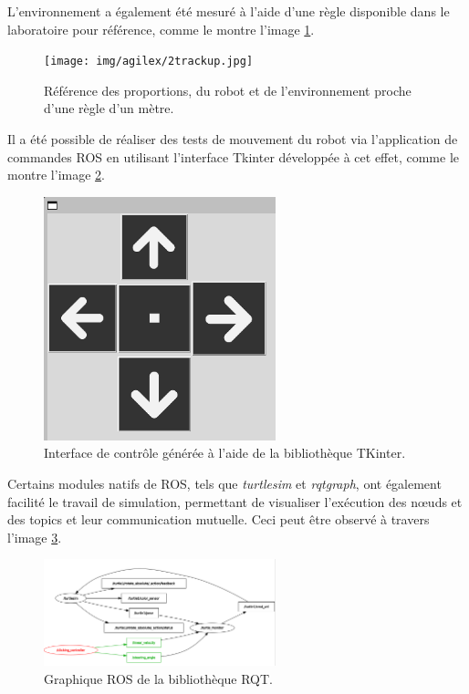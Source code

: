 L'environnement a également été mesuré à l'aide d'une règle disponible dans le laboratoire pour référence, comme le montre l'image \ref{img:track2}.

\begin{figure}[!h]
    \centering
    \texttt{[image: img/agilex/2trackup.jpg]} 
    \caption{Référence des proportions, du robot et de l'environnement proche d'une règle d'un mètre. }
    \label{img:track2}
\end{figure}
\FloatBarrier

Il a été possible de réaliser des tests de mouvement du robot via l'application de commandes ROS en utilisant l'interface Tkinter développée à cet effet, comme le montre l'image \ref{img:click}.

\begin{figure}[!h]
    \centering
    \includegraphics[width=0.6\textwidth]{img/agilex/click.png} 
    \caption{Interface de contrôle générée à l'aide de la bibliothèque TKinter.}
    \label{img:click}
\end{figure}
\FloatBarrier

Certains modules natifs de ROS, tels que \textit{turtlesim} et \textit{rqtgraph}, ont également facilité le travail de simulation, permettant de visualiser l'exécution des nœuds et des topics et leur communication mutuelle. Ceci peut être observé à travers l'image \ref{img:rqt_graph}.

\begin{figure}[!h]
    \centering
    \includegraphics[width=0.6\textwidth]{img/agilex/rqt_graph.png} 
    \caption{Graphique ROS de la bibliothèque RQT.}
    \label{img:rqt_graph}
\end{figure}
\FloatBarrier

